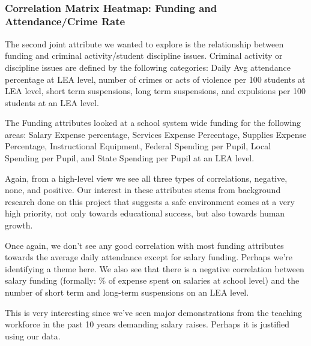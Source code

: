 \documentclass[11pt]{article}
\begin{document}
    \begin{center}
    \end{center}
    { \hspace*{\fill} \\}
    
    \subsubsection{Correlation Matrix Heatmap: Funding and Attendance/Crime
Rate}\label{correlation-matrix-heatmap-funding-and-attendancecrime-rate}

The second joint attribute we wanted to explore is the relationship
between funding and criminal activity/student discipline issues.
Criminal activity or discipline issues are defined by the following
categories: Daily Avg attendance percentage at LEA level, number of
crimes or acts of violence per 100 students at LEA level, short term
suspensions, long term suspensions, and expulsions per 100 students at
an LEA level.

The Funding attributes looked at a school system wide funding for the
following areas: Salary Expense percentage, Services Expense Percentage,
Supplies Expense Percentage, Instructional Equipment, Federal Spending
per Pupil, Local Spending per Pupil, and State Spending per Pupil at an
LEA level.

Again, from a high-level view we see all three types of correlations,
negative, none, and positive. Our interest in these attributes stems
from background research done on this project that suggests a safe
environment comes at a very high priority, not only towards educational
success, but also towards human growth.

Once again, we don't see any good correlation with most funding
attributes towards the average daily attendance except for salary
funding. Perhaps we're identifying a theme here. We also see that there
is a negative correlation between salary funding (formally: \% of
expense spent on salaries at school level) and the number of short term
and long-term suspensions on an LEA level.

This is very interesting since we've seen major demonstrations from the
teaching workforce in the past 10 years demanding salary raises. Perhaps
it is justified using our data.
\end{document}
